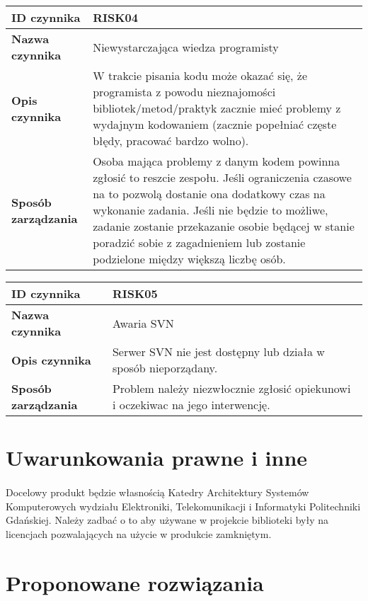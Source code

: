 \documentclass[a4paper,10pt]{article}
\begin{document}
\begin{center}
\begin{tabular}{|l|p{12cm}|}
\hline
\textbf{ID czynnika} &  RISK04 \tabularnewline \hline
\textbf{Nazwa czynnika} & Niewystarczająca wiedza programisty \tabularnewline \hline
\textbf{Opis czynnika} & W trakcie pisania kodu może okazać się, że programista z powodu nieznajomości bibliotek/metod/praktyk zacznie mieć problemy z wydajnym kodowaniem (zacznie popełniać częste błędy, pracować bardzo wolno).  \tabularnewline \hline
\textbf{Sposób zarządzania} & Osoba mająca problemy z danym kodem powinna zgłosić to reszcie zespołu. Jeśli ograniczenia czasowe na to pozwolą dostanie ona dodatkowy czas na wykonanie zadania. Jeśli nie będzie to możliwe, zadanie zostanie przekazanie osobie będącej w stanie poradzić sobie z zagadnieniem lub zostanie podzielone między większą liczbę osób. \tabularnewline \hline
\end{tabular}
\end{center}

\begin{center}
\begin{tabular}{|l|p{12cm}|}
\hline
\textbf{ID czynnika} &  RISK05 \tabularnewline \hline
\textbf{Nazwa czynnika} & Awaria SVN \tabularnewline \hline
\textbf{Opis czynnika} & Serwer SVN nie jest dostępny lub działa w sposób nieporządany. \tabularnewline \hline
\textbf{Sposób zarządzania} & Problem należy niezwłocznie zgłosić opiekunowi i oczekiwac na jego interwencję. \tabularnewline \hline
\end{tabular}
\end{center}



\section{Uwarunkowania prawne i inne}
\paragraph{} Docelowy produkt będzie własnością Katedry Architektury Systemów Komputerowych wydziału Elektroniki, Telekomunikacji i Informatyki Politechniki Gdańskiej.  Należy zadbać  o to aby używane w projekcie biblioteki były na licencjach pozwalających na użycie w produkcie zamkniętym.


\section{Proponowane rozwiązania}
\end{document}
